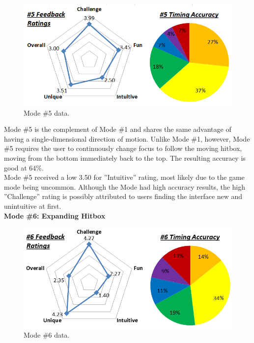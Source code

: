 \documentclass{sig-alternate}
\begin{document}
\begin{figure}[htb!]
	\begin{center}
		\includegraphics[width=1\linewidth]{figure_chart_5}
	\end{center}
	\vspace{-12pt}
	\caption{Mode \#5 data.}
	\label{fig:chart_5}
\end{figure}

Mode \#5  is the complement of Mode \#1 and shares the same advantage of having a single-dimensional direction of motion. Unlike Mode \#1, however, Mode \#5 requires the user to continuously change focus to follow the moving hitbox, moving from the bottom immediately back to the top. The resulting accuracy is good at 64\%. \\

Mode \#5 received a low 3.50 for ''Intuitive'' rating, most likely due to the game mode being uncommon. Although the Mode had high accuracy results, the high ''Challenge'' rating is possibly attributed to users finding the interface new and unintuitive at first. \\

\noindent \textbf{Mode \#6: Expanding Hitbox}

\begin{figure}[htb!]
	\begin{center}
		\includegraphics[width=1\linewidth]{figure_chart_6}
	\end{center}
	\vspace{-12pt}
	\caption{Mode \#6 data.}
	\label{fig:chart_6}
\end{figure}
\end{document}

